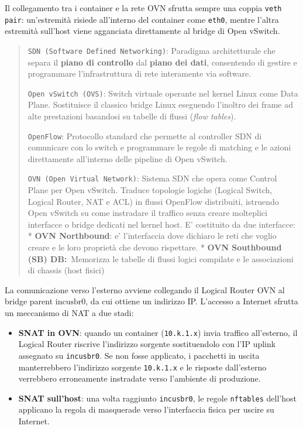 Il collegamento tra i container e la rete OVN sfrutta sempre una coppia
\passthrough{\lstinline!veth pair!}: un'estremità risiede all'interno
del container come \passthrough{\lstinline!eth0!}, mentre l'altra
estremità sull'host viene agganciata direttamente al bridge di Open
vSwitch.

\begin{quote}
\passthrough{\lstinline!SDN (Software Defined Networking)!}: Paradigma
architetturale che separa il \textbf{piano di controllo} dal
\textbf{piano dei dati}, consentendo di gestire e programmare
l'infrastruttura di rete interamente via software.

\passthrough{\lstinline!Open vSwitch (OVS)!}: Switch virtuale operante
nel kernel Linux come Data Plane. Sostituisce il classico bridge Linux
eseguendo l'inoltro dei frame ad alte prestazioni basandosi su tabelle
di flussi (\emph{flow tables}).

\passthrough{\lstinline!OpenFlow!}: Protocollo standard che permette al
controller SDN di comunicare con lo switch e programmare le regole di
matching e le azioni direttamente all'interno delle pipeline di Open
vSwitch.

\passthrough{\lstinline!OVN (Open Virtual Network)!}: Sistema SDN che
opera come Control Plane per Open vSwitch. Traduce topologie logiche
(Logical Switch, Logical Router, NAT e ACL) in flussi OpenFlow
distribuiti, istruendo Open vSwitch su come instradare il traffico senza
creare molteplici interfacce o bridge dedicati nel kernel host. E'
costituito da due interfacce: * \textbf{OVN Northbound}: e'
l'interfaccia dove dichiaro le reti che voglio creare e le loro
proprietà che devono rispettare. * \textbf{OVN Southbound (SB)
DB:}~Memorizza le tabelle di flussi logici compilate e le associazioni
di chassis (host fisici)
\end{quote}

La comunicazione verso l'esterno avviene collegando il Logical Router
OVN al bridge parent \(\text{incusbr0}\), da cui ottiene un indirizzo
IP. L'accesso a Internet sfrutta un meccanismo di NAT a due stadi:

\begin{itemize}
\tightlist
\item
  \textbf{SNAT in OVN}: quando un container
  (\passthrough{\lstinline!10.k.1.x!}) invia traffico all'esterno, il
  Logical Router riscrive l'indirizzo sorgente sostituendolo con l'IP
  uplink assegnato su \passthrough{\lstinline!incusbr0!}. Se non fosse
  applicato, i pacchetti in uscita manterrebbero l'indirizzo sorgente
  \passthrough{\lstinline!10.k.1.x!} e le risposte dall'esterno
  verrebbero erroneamente instradate verso l'ambiente di produzione.
\item
  \textbf{SNAT sull'host}: una volta raggiunto
  \passthrough{\lstinline!incusbr0!}, le regole
  \passthrough{\lstinline!nftables!} dell'host applicano la regola di
  masquerade verso l'interfaccia fisica per uscire su Internet.
\end{itemize}


